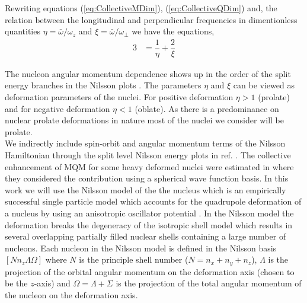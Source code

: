 \documentclass[10pt,a4paper, twoside, openright]{report}
\begin{document}
Rewriting equations (\ref{eq:CollectiveMDim}), (\ref{eq:CollectiveQDim})  and, the relation between the longitudinal  and perpendicular frequencies in dimentionless quantities $\eta = \bar{\omega}/\omega_z$ and $\xi = \bar{\omega}/\omega_{\perp}$ we have the equations,
\begin{align}
3 &= \dfrac{1}{\eta} + \dfrac{2}{\xi} \label{eq:average} 
\end{align}

The nucleon angular momentum dependence shows up in the order of the split energy branches in the Nilsson plots \cite{Nilsson1955, BohrMottVol2}.
The parameters $\eta$ and $\xi$ can be viewed as deformation parameters of the nuclei. For positive deformation $\eta > 1$ (prolate) and for negative deformation $\eta < 1$ (oblate). As there is a predominance on nuclear prolate deformations in nature most of the nuclei we consider will be prolate. \\


We indirectly include spin-orbit and angular momentum terms of the Nilsson Hamiltonian through the split level Nilsson energy plots in ref. \cite{BohrMottVol2}.
The collective enhancement of MQM for some  heavy deformed nuclei were estimated in \cite{Flambaum1994, Flambaum2014} where they considered the contribution using a spherical wave function basis. In this work we will use the Nilsson model of the the nucleus  which is an empirically successful single particle model which accounts for the quadrupole deformation of a nucleus by using an anisotropic oscillator potential \cite{Nilsson1955, Mottelson1955, BohrMottVol2}. In the Nilsson model the deformation breaks the degeneracy of the isotropic shell model which results in several overlapping partially filled nuclear shells containing a large number of nucleons.  Each nucleon in the Nilsson model is defined in the Nilsson basis $\left[Nn_z\Lambda\Omega\right]$ where $N$ is the principle shell number ($N = n_x + n_y + n_z$), $\Lambda$ is the projection of the orbital angular momentum on the deformation axis (chosen to be the $z$-axis) and $\Omega = \Lambda + \Sigma$ is the projection of the total angular momentum of the nucleon on the deformation axis.
\end{document}
